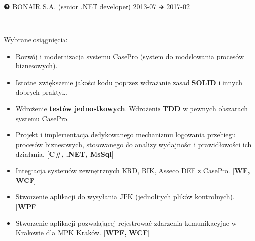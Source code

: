 \documentclass[a4paper,11pt]{article}
\newcommand{\cvEnuItemBox}[1]
{%
	\hspace{26pt}\parbox{.93\textwidth}{#1}
}
\newcommand{\cvSectionEntry}[1]
{%
	\vspace{-1pt}\noindent\setlength{\fboxsep}{0pt}\setlength{\fboxrule}{0pt}%
	\colorbox{bg}
	{%
		\color{fg}%
		\begin{minipage}[t]{\textwidth}
			#1 %
		\end{minipage}%
	}%
}
\newcommand{\cvSectionEntryHeader}[4]
{%
	\vspace{8pt}\hspace{26pt}\parbox{.93\textwidth}
	{%
		\fontsize{13pt}{1em}\selectfont #1 \hspace{2pt} #2 \hfill #3 {\segoesym ➔} #4 %
	}\\
}
\newcommand{\cvSectionEntryBody}[2]
{%
	\cvEnuItemBox{\hspace{27pt}#1#2}
}
\begin{document}
\pagebreak\vspace*{-11pt}

\cvSectionEntry
{
	\vspace{14pt}
	\cvSectionEntryHeader{❸}{BONAIR S.A. (senior .NET developer)}{2013-07}{2017-02}

	\cvSectionEntryBody{Wybrane osiągnięcia:}
	{
		\begin{itemize}
			\setlength\itemsep{-1pt}
			\item Rozwój i modernizacja systemu CasePro (system do modelowania procesów biznesowych).
			\item Istotne zwiększenie jakości kodu poprzez wdrażanie zasad \textbf{SOLID} i innych dobrych praktyk.
			\item Wdrożenie \textbf{testów jednostkowych}. Wdrożenie \textbf{TDD} w pewnych obszarach systemu CasePro.
			\item Projekt i implementacja dedykowanego mechanizmu logowania przebiegu procesów biznesowych, stosowanego do analizy wydajności i prawidłowości ich działania. [\textbf{C\#, .NET, MsSql}]
			\item Integracja systemów zewnętrznych KRD, BIK, Asseco DEF z CasePro. [\textbf{WF, WCF}]
			\item Stworzenie aplikacji do wysyłania JPK (jednolitych plików kontrolnych). [\textbf{WPF}]
			\item Stworzenie aplikacji pozwalającej rejestrować zdarzenia komunikacyjne w Krakowie dla MPK Kraków. [\textbf{WPF, WCF}]
		\end{itemize}
	}
	\vspace{28pt}
}
\end{document}
